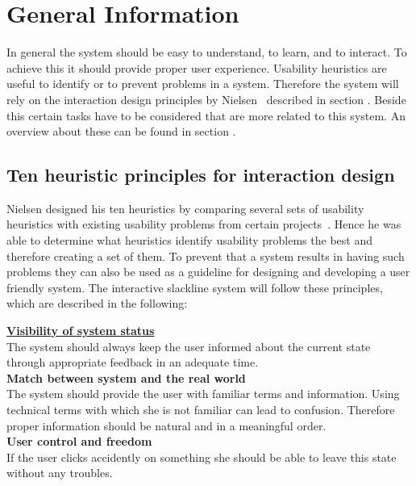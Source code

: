 \section{General Information}\label{4_1_general}
In general the system should be easy to understand, to learn, and to interact. To achieve this it should provide proper user experience. Usability heuristics are useful to identify or to prevent problems in a system. Therefore the system will rely on the interaction design principles by Nielsen~\cite{Nielsen_1994-he} described in section \textit{}. Beside this certain tasks have to be considered that are more related to this system. An overview about these can be found in section \textit{}.

\subsection{Ten heuristic principles for interaction design}\label{nielsenDesignPrinciples}
Nielsen designed his ten heuristics by comparing several sets of usability heuristics with existing usability problems from certain projects~\cite{Nielsen_1994-he}. Hence he was able to determine what heuristics identify usability problems the best and therefore creating a set of them. To prevent that a system results in having such problems they can also be used as a guideline for designing and developing a user friendly system. The interactive slackline system will follow these principles, which are described in the following:

\textbf{\hyperref[4_1_1_visibilitySystemStatus]{Visibility of system status}}\\
The system should always keep the user informed about the current state through appropriate feedback in an adequate time.\\

\textbf{Match between system and the real world}\\
The system should provide the user with familiar terms and information. Using technical terms with which she is not familiar can lead to confusion. Therefore proper information should be natural and in a meaningful order.\\

\textbf{User control and freedom}\\
If the user clicks accidently on something she should be able to leave this state without any troubles.\\

